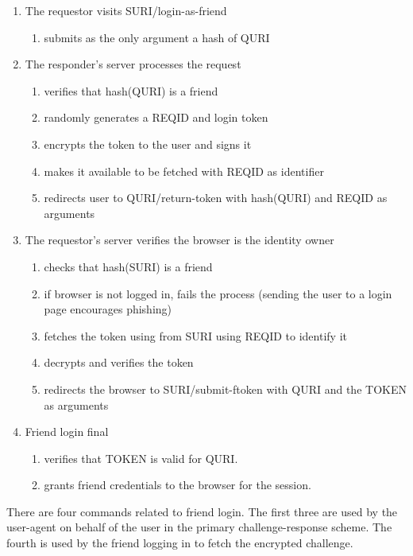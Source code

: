 \documentclass[letterpaper,11pt,oneside]{article}
\begin{document}
\begin{enumerate}
\item The requestor visits SURI/login-as-friend
    \begin{enumerate}
    \item submits as the only argument a hash of QURI
    \end{enumerate}

\item The responder's server processes the request
    \begin{enumerate}
    \item verifies that hash(QURI) is a friend
    \item randomly generates a REQID and login token
    \item encrypts the token to the user and signs it
    \item makes it available to be fetched with REQID as identifier
    \item redirects user to QURI/return-token with hash(QURI) and REQID as
            arguments
    \end{enumerate}

\item The requestor's server verifies the browser is the identity owner
    \begin{enumerate}
    \item checks that hash(SURI) is a friend
    \item if browser is not logged in, fails the process
            (sending the user to a login page encourages phishing)
    \item fetches the token using from SURI using REQID to identify it
    \item decrypts and verifies the token
    \item redirects the browser to SURI/submit-ftoken with QURI and the TOKEN
            as arguments
    \end{enumerate}

\item Friend login final
    \begin{enumerate}
    \item verifies that TOKEN is valid for QURI.
    \item grants friend credentials to the browser for the session.
    \end{enumerate}
\end{enumerate}

There are four commands related to friend login. The first three are used by
the user-agent on behalf of the user in the primary challenge-response scheme.
The fourth is used by the friend logging in to fetch the encrypted challenge.
\end{document}
